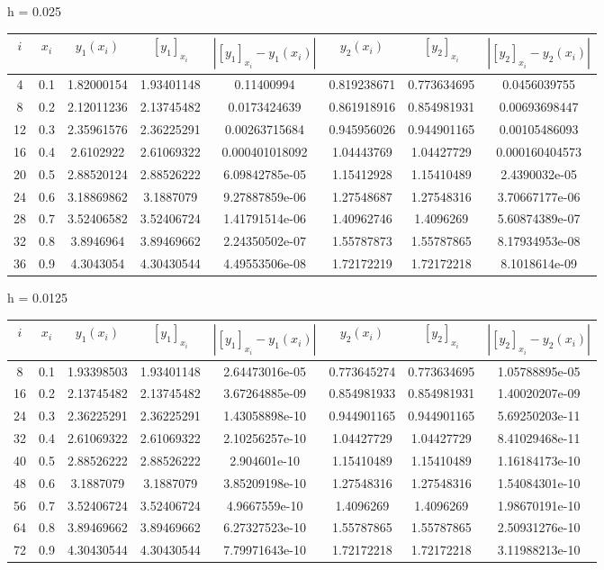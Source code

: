 \documentclass[11pt]{article}
\begin{document}
h = 0.025 \\ 
\begin{tabular}{c | c c c c c c c}
$i$ & $x_i$ & $y_1(x_i)$ & $[y_1]_{x_i}$ & $|[y_1]_{x_i} - y_1(x_i)|$ & $y_2(x_i)$ & $[y_2]_{x_i}$ & $|[y_2]_{x_i} - y_2(x_i)|$ \\ \hline
4 & 0.1 & 1.82000154 & 1.93401148 & 0.11400994 & 0.819238671 & 0.773634695 & 0.0456039755 \\
8 & 0.2 & 2.12011236 & 2.13745482 & 0.0173424639 & 0.861918916 & 0.854981931 & 0.00693698447 \\
12 & 0.3 & 2.35961576 & 2.36225291 & 0.00263715684 & 0.945956026 & 0.944901165 & 0.00105486093 \\
16 & 0.4 & 2.6102922 & 2.61069322 & 0.000401018092 & 1.04443769 & 1.04427729 & 0.000160404573 \\
20 & 0.5 & 2.88520124 & 2.88526222 & 6.09842785e-05 & 1.15412928 & 1.15410489 & 2.4390032e-05 \\
24 & 0.6 & 3.18869862 & 3.1887079 & 9.27887859e-06 & 1.27548687 & 1.27548316 & 3.70667177e-06 \\
28 & 0.7 & 3.52406582 & 3.52406724 & 1.41791514e-06 & 1.40962746 & 1.4096269 & 5.60874389e-07 \\
32 & 0.8 & 3.8946964 & 3.89469662 & 2.24350502e-07 & 1.55787873 & 1.55787865 & 8.17934953e-08 \\
36 & 0.9 & 4.3043054 & 4.30430544 & 4.49553506e-08 & 1.72172219 & 1.72172218 & 8.1018614e-09 \\
\end{tabular}

h = 0.0125 \\ 
\begin{tabular}{c | c c c c c c c}
$i$ & $x_i$ & $y_1(x_i)$ & $[y_1]_{x_i}$ & $|[y_1]_{x_i} - y_1(x_i)|$ & $y_2(x_i)$ & $[y_2]_{x_i}$ & $|[y_2]_{x_i} - y_2(x_i)|$ \\ \hline
8 & 0.1 & 1.93398503 & 1.93401148 & 2.64473016e-05 & 0.773645274 & 0.773634695 & 1.05788895e-05 \\
16 & 0.2 & 2.13745482 & 2.13745482 & 3.67264885e-09 & 0.854981933 & 0.854981931 & 1.40020207e-09 \\
24 & 0.3 & 2.36225291 & 2.36225291 & 1.43058898e-10 & 0.944901165 & 0.944901165 & 5.69250203e-11 \\
32 & 0.4 & 2.61069322 & 2.61069322 & 2.10256257e-10 & 1.04427729 & 1.04427729 & 8.41029468e-11 \\
40 & 0.5 & 2.88526222 & 2.88526222 & 2.904601e-10 & 1.15410489 & 1.15410489 & 1.16184173e-10 \\
48 & 0.6 & 3.1887079 & 3.1887079 & 3.85209198e-10 & 1.27548316 & 1.27548316 & 1.54084301e-10 \\
56 & 0.7 & 3.52406724 & 3.52406724 & 4.9667559e-10 & 1.4096269 & 1.4096269 & 1.98670191e-10 \\
64 & 0.8 & 3.89469662 & 3.89469662 & 6.27327523e-10 & 1.55787865 & 1.55787865 & 2.50931276e-10 \\
72 & 0.9 & 4.30430544 & 4.30430544 & 7.79971643e-10 & 1.72172218 & 1.72172218 & 3.11988213e-10 \\
\end{tabular}
\end{document}
